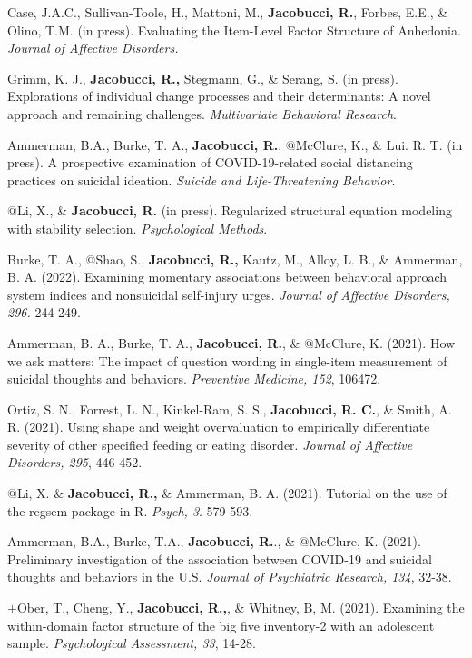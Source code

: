 \documentclass[letterpaper,10pt]{article}
\begin{document}
\begin{etaremune}
	\item Case, J.A.C., Sullivan-Toole, H., Mattoni, M., \textbf{Jacobucci, R.}, Forbes, E.E., \& Olino, T.M. (in press). Evaluating the Item-Level Factor Structure of Anhedonia. \emph{Journal of Affective Disorders.}
	
	\item Grimm, K. J., \textbf{Jacobucci, R.,} Stegmann, G., \& Serang, S. (in press). Explorations of individual change processes and their determinants: A novel approach and remaining challenges. \emph{Multivariate Behavioral Research}.
	\item Ammerman, B.A., Burke, T. A., \textbf{Jacobucci, R.}, $@$McClure, K., \& Lui. R. T. (in press). A prospective examination of COVID-19-related social distancing practices on suicidal ideation. \emph{Suicide and Life-Threatening Behavior}.
	\item $@$Li, X., \& \textbf{Jacobucci, R.} (in press). Regularized structural equation modeling with stability selection. \emph{Psychological Methods}.
	\item Burke, T. A., $@$Shao, S., \textbf{Jacobucci, R.,} Kautz, M., Alloy, L. B., \& Ammerman, B. A. (2022). Examining momentary associations between behavioral approach system indices and nonsuicidal self-injury urges. \emph{Journal of Affective Disorders, 296.} 244-249.
	\item Ammerman, B. A., Burke, T. A., \textbf{Jacobucci, R.}, \& $@$McClure, K. (2021). How we ask matters: The impact of question wording in single-item measurement of suicidal thoughts and behaviors. \emph{Preventive Medicine, 152}, 106472.
	\item Ortiz, S. N., Forrest, L. N., Kinkel-Ram, S. S., \textbf{Jacobucci, R. C.}, \& Smith, A. R. (2021). Using shape and weight overvaluation to empirically differentiate severity of other specified feeding or eating disorder. \emph{Journal of Affective Disorders, 295}, 446-452.
	\item $@$Li, X. \& \textbf{Jacobucci, R.,} \& Ammerman, B. A. (2021). Tutorial on the use of the regsem package in R. \emph{Psych, 3}. 579-593.
		\item Ammerman, B.A., Burke, T.A., \textbf{Jacobucci, R.}., \& $@$McClure, K. (2021). Preliminary investigation of the association between COVID-19 and suicidal thoughts and behaviors in the U.S. \emph{Journal of Psychiatric Research, 134}, 32-38.
	\item $+$Ober, T., Cheng, Y., \textbf{Jacobucci, R.,}, \& Whitney, B, M. (2021). Examining the within-domain factor structure of the big five inventory-2 with an adolescent sample. \emph{Psychological Assessment, 33}, 14-28.

\end{etaremune}
\end{document}
